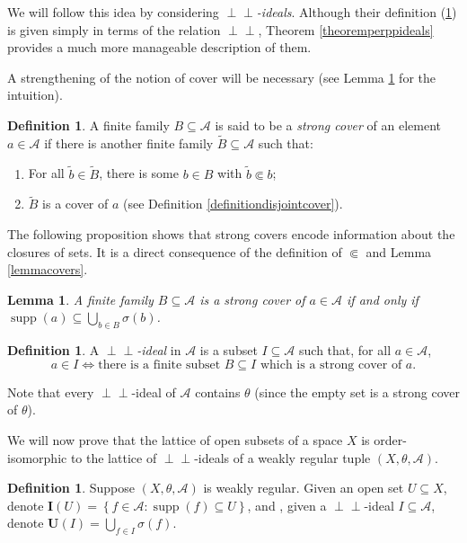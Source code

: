\documentclass[letter,11pt]{amsart}
\theoremstyle{plain}		\newtheorem{theorem}[generalnumbering]{Theorem}
\theoremstyle{plain}		\newtheorem{corollary}[generalnumbering]{Corollary}
\theoremstyle{definition}		\newtheorem{definition}[generalnumbering]{Definition}
\theoremstyle{definition}		\newtheorem{example}[generalnumbering]{Example}
\theoremstyle{plain}		\newtheorem{proposition}[generalnumbering]{Proposition}
\theoremstyle{plain}		\newtheorem{lemma}[generalnumbering]{Lemma}
\theoremstyle{plain}    \newtheorem{plainstyle}[generalnumbering]{\namefordifferentenvironment}
\theoremstyle{plain}    \newtheorem*{plainstyle*}{\namefordifferentenvironment}
\theoremstyle{definition}    \newtheorem{definitionstyle}[generalnumbering]{\namefordifferentenvironment}
\theoremstyle{definition}    \newtheorem*{definitionstyle*}{\namefordifferentenvironment}
\newcommand{\perpp}{\perp\!\!\!\perp}
\DeclareMathOperator{\supp}{supp}
\begin{document}
We will follow this idea by considering \emph{$\perpp$-ideals}. Although their definition (\ref{definitionperppideal}) is given simply in terms of the relation $\perpp$, Theorem \ref{theoremperppideals} provides a much more manageable description of them. 

A strengthening of the notion of cover will be necessary (see Lemma \ref{lemmagoodformofstrongcover} for the intuition).

\begin{definition}\label{definitionstrongcover}
	A finite family $B\subseteq\mathcal{A}$ is said to be a \emph{strong cover} of an element $a\in\mathcal{A}$ if there is another finite family $\widetilde{B}\subseteq\mathcal{A}$ such that:
	\begin{enumerate}[label=(SC\arabic*)]
		\item For all $\widetilde{b}\in\widetilde{B}$, there is some $b\in B$ with $\widetilde{b}\Subset b$;
		\item $\widetilde{B}$ is a cover of $a$ (see Definition \ref{definitiondisjointcover}).
	\end{enumerate}
\end{definition}

The following proposition shows that strong covers encode information about the closures of sets. It is a direct consequence of the definition of $\Subset$ and Lemma \ref{lemmacovers}.

\begin{lemma}\label{lemmagoodformofstrongcover}
	A finite family $B\subseteq\mathcal{A}$ is a strong cover of $a\in\mathcal{A}$ if and only if $\supp(a)\subseteq\bigcup_{b\in B}\sigma(b)$.
\end{lemma}

\begin{definition}\label{definitionperppideal}
	A \emph{$\perpp$-ideal} in $\mathcal{A}$ is a subset $I\subseteq\mathcal{A}$ such that, for all $a\in\mathcal{A}$,
	\[a\in I\iff \text{there is a finite subset }B\subseteq I\text{ which is a strong cover of }a.\]
\end{definition}

Note that every $\perpp$-ideal of $\mathcal{A}$ contains $\theta$ (since the empty set is a strong cover of $\theta$).

We will now prove that the lattice of open subsets of a space $X$ is order-isomorphic to the lattice of $\perpp$-ideals of a weakly regular tuple $(X,\theta,\mathcal{A})$.

\begin{definition}
	Suppose $(X,\theta,\mathcal{A})$ is weakly regular. Given an open set $U\subseteq X$, denote $\mathbf{I}(U)=\left\{f\in\mathcal{A}:\supp(f)\subseteq U\right\}$, and , given a $\perpp$-ideal $I\subseteq\mathcal{A}$, denote $\mathbf{U}(I)=\bigcup_{f\in I}\sigma(f)$.
\end{definition}
\end{document}
